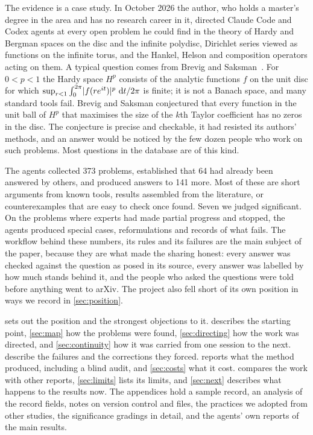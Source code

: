\documentclass[11pt]{amsart}
\DeclarePairedDelimiter{\abs}{\lvert}{\rvert}
\newcommand*{\dd}{\mathop{}\!\mathrm{d}}
\begin{document}
The evidence is a case study. In October 2026 the author, who holds a master's
degree in the area and has no research career in it, directed Claude Code and
Codex agents at every open problem he could find in the theory of Hardy and
Bergman spaces on the disc and the infinite polydisc, Dirichlet series viewed
as functions on the infinite torus, and the Hankel, Helson and composition
operators acting on them. A typical question comes from Brevig and
Saksman~\cite{brevigsaksman}. For $0<p<1$ the Hardy space $H^p$ consists of the
analytic functions $f$ on the unit disc for which
$\sup_{r<1}\int_0^{2\pi}\abs{f(re^{it})}^p\,\dd t/2\pi$ is finite; it is not a
Banach space, and many standard tools fail. Brevig and Saksman conjectured that
every function in the unit ball of $H^p$ that maximises the size of the $k$th
Taylor coefficient has no zeros in the disc. The conjecture is precise and
checkable, it had resisted its authors' methods, and an answer would be noticed
by the few dozen people who work on such problems. Most questions in the
database are of this kind.

The agents collected 373 problems, established that 64 had already been
answered by others, and produced answers to 141 more. Most of these are short
arguments from known tools, results assembled from the literature, or
counterexamples that are easy to check once found. Seven we judged significant.
On the problems where experts had made partial progress and stopped, the agents
produced special cases, reformulations and records of what fails. The workflow
behind these numbers, its rules and its failures are the main subject of the
paper, because they are what made the sharing honest: every answer was checked
against the question as posed in its source, every answer was labelled by how
much stands behind it, and the people who asked the questions were told before
anything went to arXiv. The project also fell short of its own position in ways
we record in \cref{sec:position}.

 sets out the position and the strongest objections to it.
 describes the starting point, \cref{sec:map} how the problems
were found, \cref{sec:directing} how the work was directed, and
\cref{sec:continuity} how it was carried from one session to the next.
 describe the failures and the corrections they
forced.  reports what the method produced, including a blind
audit, and \cref{sec:costs} what it cost.  compares the work
with other reports, \cref{sec:limits} lists its limits, and \cref{sec:next}
describes what happens to the results now. The appendices hold a sample record,
an analysis of the record fields, notes on version control and files, the
practices we adopted from other studies, the significance gradings in detail,
and the agents' own reports of the main results.
\end{document}
